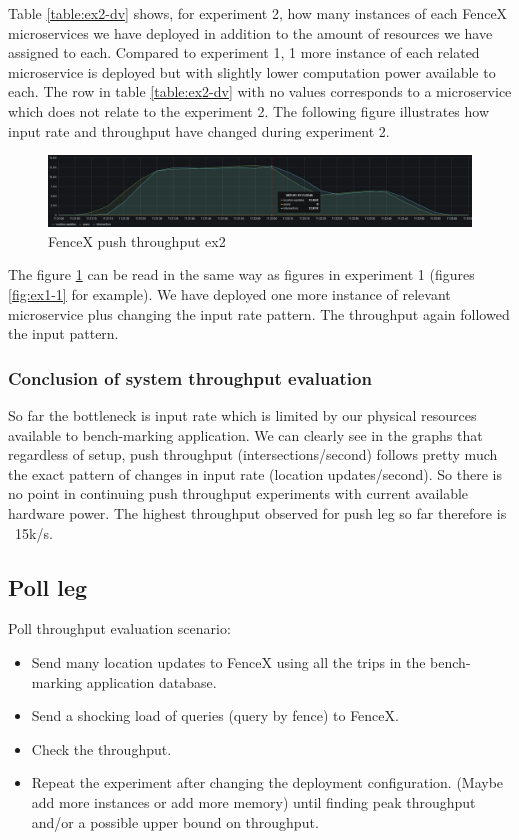 \documentclass[a4]{report}
\begin{document}
    Table \ref{table:ex2-dv} shows, for experiment 2, how many instances of each FenceX microservices we have
    deployed in addition to the amount of resources we have assigned to each.
    Compared to experiment 1, 1 more instance of each related microservice is deployed but with slightly lower
    computation power available to each.
    The row in table \ref{table:ex2-dv} with no values corresponds to a microservice which does not relate to the
    experiment 2.
    The following figure illustrates how input rate and throughput have changed during experiment 2.

    \begin{figure}[h!]
        \centering
        \caption{FenceX push throughput ex2}
        \label{fig:ex2}
        \includegraphics[width=\linewidth, scale=2]{images/evaluation/ex2-benchmarking(24,10).png}
    \end{figure}

    The figure \ref{fig:ex2} can be read in the same way as figures in experiment 1 (figures \ref{fig:ex1-1} for
    example).
    We have deployed one more instance of relevant microservice plus changing the input rate pattern.
    The throughput again followed the input pattern.

    \subsubsection{Conclusion of system throughput evaluation}
    So far the bottleneck is input rate which is limited by our physical resources available to bench-marking
    application.
    We can clearly see in the graphs that regardless of setup, push throughput (intersections/second) follows pretty
    much the exact pattern of changes in input rate (location updates/second).
    So there is no point in continuing push throughput experiments with current available hardware power.
    The highest throughput observed for push leg so far therefore is ~15k/s.

    \clearpage

    \subsection{Poll leg}
    Poll throughput evaluation scenario:
    \begin{itemize}
        \item[1-] Send many location updates to FenceX using all the trips in the bench-marking application database.
        \item[2-] Send a shocking load of queries (query by fence) to FenceX.
        \item[3-] Check the throughput.
        \item[4-] Repeat the experiment after changing the deployment configuration. (Maybe add more instances or add
        more memory) until finding peak throughput and/or a possible upper bound on throughput.
    \end{itemize}
\end{document}
